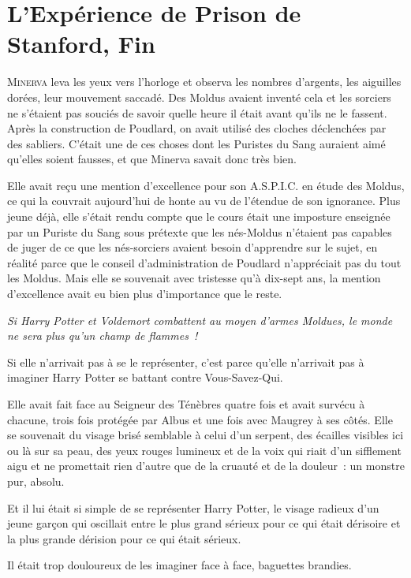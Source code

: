 \chapter{L'Expérience de Prison de Stanford, Fin}

\lettrine{M}{inerva} leva les yeux vers l'horloge et observa les nombres d'argents, les aiguilles dorées, leur mouvement saccadé. Des Moldus avaient inventé cela et les sorciers ne s'étaient pas souciés de savoir quelle heure il était avant qu'ils ne le fassent. Après la construction de Poudlard, on avait utilisé des cloches déclenchées par des sabliers. C'était une de ces choses dont les Puristes du Sang auraient aimé qu'elles soient fausses, et que Minerva savait donc très bien.

Elle avait reçu une mention d'excellence pour son A.S.P.I.C. en étude des Moldus, ce qui la couvrait aujourd'hui de honte au vu de l'étendue de son ignorance. Plus jeune déjà, elle s'était rendu compte que le cours était une imposture enseignée par un Puriste du Sang sous prétexte que les nés-Moldus n'étaient pas capables de juger de ce que les nés-sorciers avaient besoin d'apprendre sur le sujet, en réalité parce que le conseil d'administration de Poudlard n'appréciait pas du tout les Moldus. Mais elle se souvenait avec tristesse qu'à dix-sept ans, la mention d'excellence avait eu bien plus d'importance que le reste.

\emph{Si Harry Potter et Voldemort combattent au moyen d'armes Moldues, le monde ne sera plus qu'un champ de flammes~!}

Si elle n'arrivait pas à se le représenter, c'est parce qu'elle n'arrivait pas à imaginer Harry Potter se battant contre Vous-Savez-Qui.

Elle avait fait face au Seigneur des Ténèbres quatre fois et avait survécu à chacune, trois fois protégée par Albus et une fois avec Maugrey à ses côtés. Elle se souvenait du visage brisé semblable à celui d'un serpent, des écailles visibles ici ou là sur sa peau, des yeux rouges lumineux et de la voix qui riait d'un sifflement aigu et ne promettait rien d'autre que de la cruauté et de la douleur~: un monstre pur, absolu.

Et il lui était si simple de se représenter Harry Potter, le visage radieux d'un jeune garçon qui oscillait entre le plus grand sérieux pour ce qui était dérisoire et la plus grande dérision pour ce qui était sérieux.

Il était trop douloureux de les imaginer face à face, baguettes brandies.

